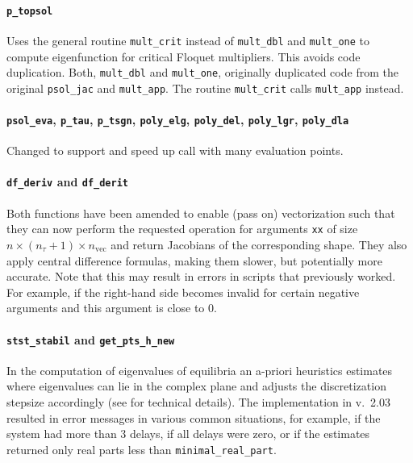\documentclass[11pt]{scrartcl}
\newcommand{\mt}[1]{\mathrm{#1}}
\newcommand{\blist}[1]{\mbox{\lstinline!#1!}}
\begin{document}
\paragraph{\blist{p_topsol}} Uses the general routine
\blist{mult_crit} instead of \blist{mult_dbl} and \blist{mult_one} to
compute eigenfunction for critical Floquet multipliers. This avoids
code duplication. Both, \blist{mult_dbl} and \blist{mult_one},
originally duplicated code from the original \blist{psol_jac} and
\blist{mult_app}. The routine \blist{mult_crit} calls \blist{mult_app}
instead.

\paragraph{\blist{psol_eva}, \blist{p_tau}, \blist{p_tsgn},
  \blist{poly_elg}, \blist{poly_del}, \blist{poly_lgr},
  \blist{poly_dla}} Changed to support and speed up call with many
evaluation points.


\paragraph{\blist{df_deriv} and \blist{df_derit}}
Both functions have been amended to enable (pass on) vectorization
such that they can now perform the requested operation for arguments
\blist{xx} of size $n\times (n_\tau+1)\times n_\mt{vec}$ and return
Jacobians of the corresponding shape. They also apply central
difference formulas, making them slower, but potentially more
accurate.  Note that this may result in errors in scripts that
previously worked. For example, if the right-hand side becomes invalid
for certain negative arguments and this argument is close to $0$.

\paragraph{\blist{stst_stabil} and \blist{get_pts_h_new}}
In the computation of eigenvalues of equilibria an a-priori heuristics
estimates where eigenvalues can lie in the complex plane and adjusts
the discretization stepsize accordingly (see \cite{VLR08} for
technical details). The implementation in v.~2.03 resulted in error
messages in various common situations, for example, if the system had
more than $3$ delays, if all delays were zero, or if the estimates
returned only  real parts less than \blist{minimal_real_part}.
\end{document}
